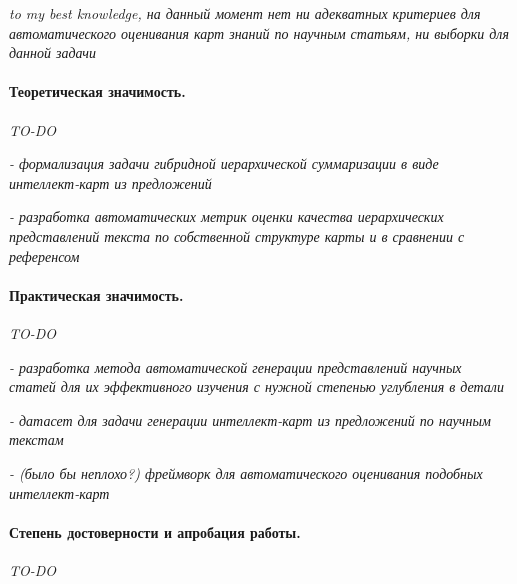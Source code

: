 \documentclass[12pt]{article}
\begin{document}
\textit{to my best knowledge, на данный момент нет ни адекватных критериев для автоматического оценивания карт знаний по научным статьям, ни выборки для данной задачи}


\paragraph{Теоретическая значимость.}
\textit{TO-DO}

\textit{- формализация задачи гибридной иерархической суммаризации в виде интеллект-карт из предложений}

\textit{- разработка автоматических метрик оценки качества иерархических представлений текста по собственной структуре карты и в сравнении с референсом}


\paragraph{Практическая значимость.}
\textit{TO-DO}

\textit{- разработка метода автоматической генерации представлений научных статей для их эффективного изучения с нужной степенью углубления в детали}

\textit{- датасет для задачи генерации интеллект-карт из предложений по научным текстам}

\textit{- (было бы неплохо?) фреймворк для автоматического оценивания подобных интеллект-карт}


\paragraph{Степень достоверности и апробация работы.}
\textit{TO-DO}

\newpage
\end{document}

